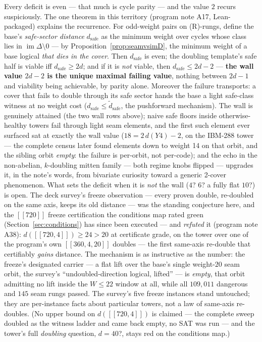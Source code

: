 \documentclass[11pt]{article}
\theoremstyle{plain}
\theoremstyle{definition}
\theoremstyle{remark}
\newcommand{\imD}{\operatorname{im}\Delta}
\begin{document}
Every deficit is even --- that much is cycle parity --- and the value
$2$ recurs suspiciously. The one theorem in this territory (program note
A17, Lean-packaged) explains the recurrence. For odd-weight pairs on
(R)-rungs, define the base's \emph{safe-sector distance} $d_{\mathrm{safe}}$
as the minimum weight over cycles whose class lies in $\imD \setminus 0$
--- by Proposition~\ref{prop:seamvsimD}, the minimum weight of a base
logical \emph{that dies in the cover}. Then $d_{\mathrm{safe}}$ is even;
the doubling template's safe half is viable iff $d_{\mathrm{safe}} \geq
2d$; and if it is \emph{not} viable, then $d_{\mathrm{safe}} \leq 2d - 2$
--- \textbf{the wall value $2d - 2$ is the unique maximal failing
value}, nothing between $2d - 1$ and viability being achievable, by
parity alone. Moreover the failure transports: a cover that fails to
double through its safe sector hands the base a light safe-class witness
at no weight cost ($d_{\mathrm{safe}} \leq \tilde d_{\mathrm{safe}}$,
the pushforward mechanism). The wall is genuinely attained (the two
wall rows above); naive safe floors inside otherwise-healthy towers fail
through light seam elements, and the first such element ever surfaced sat
at exactly the wall value ($18 = 2\,d(Y4) - 2$, on the IBM-288 tower ---
the complete census later found elements down to weight 14 on that
orbit, and the sibling orbit \emph{empty}: the failure is per-orbit, not
per-code); and the echo in the non-abelian, $k$-doubling mitten family
--- both regime knobs flipped --- upgrades it, in the note's words, from
bivariate curiosity toward a generic 2-cover phenomenon. What sets the deficit
when it is \emph{not} the wall ($4$? $6$? a fully flat $10$?) is open.
The deck survey's freeze observation --- every proven double, re-doubled
on the same axis, keeps its old distance --- was the standing conjecture
here, and the $[[720]]$ freeze certification the conditions map rated
green (Section~\ref{sec:conditions}) has since been executed --- and
\emph{refuted} it (program note A38): $d([[720,4]]) \geq 24 > 20$ at
certificate grade, on the tower over one of the program's own
$[[360,4,20]]$ doubles --- the first same-axis re-double that certifiably
\emph{gains} distance. The mechanism is as instructive as the number:
the freeze's designated carrier --- a flat lift over the base's single
weight-$20$ seam orbit, the survey's ``undoubled-direction logical,
lifted'' --- is \emph{empty}, that orbit admitting no lift inside the
$W \leq 22$ window at all, while all $109{,}011$ dangerous and $145$
seam rungs passed. The survey's five freeze instances stand untouched;
they are per-instance facts about particular towers, not a law of
same-axis re-doubles. (No upper bound on $d([[720,4]])$ is claimed ---
the complete sweep doubled as the witness ladder and came back empty, no
SAT was run --- and the tower's full \emph{doubling} question, $d = 40$?,
stays red on the conditions map.)
\end{document}
